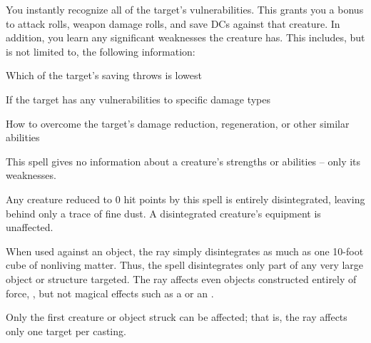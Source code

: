 \spellrng{\rngmed}
\begin{spelleffect}
  You instantly recognize all of the target's vulnerabilities. This grants you a  bonus to attack rolls, weapon damage rolls, and save DCs against that creature. In addition, you learn any significant weaknesses the creature has. This includes, but is not limited to, the following information:
  \begin{itemize*}
    \item Which of the target's saving throws is lowest
    \item If the target has any vulnerabilities to specific damage types
    \item How to overcome the target's damage reduction, regeneration, or other similar abilities
  \end{itemize*}
\end{spelleffect}
\begin{spellnotes}
  This spell gives no information about a creature's strengths or abilities -- only its weaknesses.
\end{spellnotes}

\spellrng{\rngclose}
\begin{spelleffect}
  Any creature reduced to 0 hit points by this spell is entirely disintegrated, leaving behind only a trace of fine dust. A disintegrated creature's equipment is unaffected.
  \par When used against an object, the ray simply disintegrates as much as one 10-foot cube of nonliving matter. Thus, the spell disintegrates only part of any very large object or structure targeted. The ray affects even objects constructed entirely of force, , but not magical effects such as a  or an .
\end{spelleffect}
\begin{spellnotes}
  Only the first creature or object struck can be affected; that is, the ray affects only one target per casting.
\end{spellnotes}

